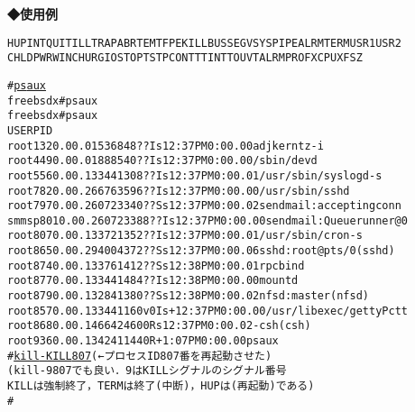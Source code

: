 \noindent
{\bf ◆使用例}
\begin{center}
\begin{breakbox}
\begin{alltt}
% \underline{kill -l}  （←使えるシグナル名を探す）
HUP INT QUIT ILL TRAP ABRT EMT FPE KILL BUS SEGV SYS PIPE ALRM TERM USR1 USR2 
CHLD PWR WINCH URG IO STOP TSTP CONT TTIN TTOU VTALRM PROF XCPU XFSZ

# \underline{ps aux}
freebsdx# ps aux
freebsdx# ps aux
USER    PID %CPU %MEM   VSZ   RSS  TT  STAT STARTED      TIME COMMAND
root    132  0.0  0.0  1536   848  ??  Is   12:37PM   0:00.00 adjkerntz -i
root    449  0.0  0.0  1888   540  ??  Is   12:37PM   0:00.00 /sbin/devd
root    556  0.0  0.1  3344  1308  ??  Is   12:37PM   0:00.01 /usr/sbin/syslogd -s
root    782  0.0  0.2  6676  3596  ??  Is   12:37PM   0:00.00 /usr/sbin/sshd
root    797  0.0  0.2  6072  3340  ??  Ss   12:37PM   0:00.02 sendmail: accepting conn
smmsp   801  0.0  0.2  6072  3388  ??  Is   12:37PM   0:00.00 sendmail: Queue runner@0
root    807  0.0  0.1  3372  1352  ??  Is   12:37PM   0:00.01 /usr/sbin/cron -s
root    865  0.0  0.2  9400  4372  ??  Ss   12:37PM   0:00.06 sshd: root@pts/0 (sshd)
root    874  0.0  0.1  3376  1412  ??  Ss   12:38PM   0:00.01 rpcbind
root    877  0.0  0.1  3344  1484  ??  Is   12:38PM   0:00.00 mountd
root    879  0.0  0.1  3284  1380  ??  Ss   12:38PM   0:00.02 nfsd: master (nfsd)
root    857  0.0  0.1  3344  1160  v0  Is+  12:37PM   0:00.00 /usr/libexec/getty Pc tt
root    868  0.0  0.1  4664  2460   0  Rs   12:37PM   0:00.02 -csh (csh)
root    936  0.0  0.1  3424  1144   0  R+    1:07PM   0:00.00 ps aux
# \underline{kill -KILL 807}(←プロセス ID 807番を再起動させた)
(kill -9 807 でも良い．9はKILLシグナルのシグナル番号
KILLは強制終了，TERMは終了(中断)，HUPは(再起動)である)
#
\end{alltt}
\end{breakbox}
\end{center}
\clearpage
